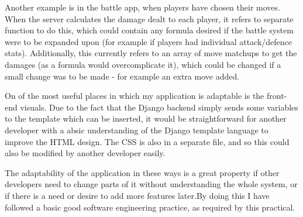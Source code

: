 \documentclass{article}
\begin{document}
Another example is in the battle app, when players have chosen their moves. When the server calculates the damage dealt to each player, it refers to separate function to do this, which could contain any formula desired if the battle system were to be expanded upon (for example if players had individual attack/defence stats). Additionally, this currently refers to an array of move matchups to get the damages (as a formula would overcomplicate it), which could be changed if a small change was to be made - for example an extra move added.

On of the most useful places in which my application is adaptable is the front-end visuals. Due to the fact that the Django backend simply sends some variables to the template which can be inserted, it would be straightforward for another developer with a absic understanding of the Django template language to improve the HTML design. The CSS is also in a separate file, and so this could also be modified by another developer easily.

The adaptability of the application in these ways is a great property if other developers need to change parts of it without understanding the whole system, or if there is a need or desire to add more features later.By doing this I have followed a basic good software engineering practice, as required by this practical.


%
%
%
%
%
%
%
\end{document}
